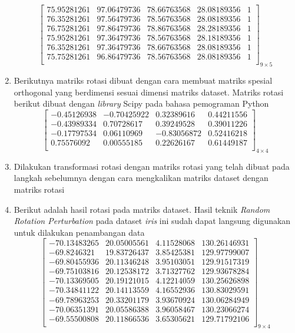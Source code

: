 \begin{enumerate}
\[\begin{bmatrix}
            75.95281261  & 97.06479736 &  78.66763568 &  28.08189356 & 1 \\
            76.35281261  & 97.56479736 &  78.56763568 &  28.08189356 & 1 \\
            76.75281261  & 97.86479736 &  78.86763568 &  28.28189356 & 1 \\
            75.95281261  & 97.36479736 &  78.56763568 &  28.18189356 & 1 \\
            76.35281261  & 97.36479736 &  78.66763568 &  28.08189356 & 1 \\
            75.75281261  & 96.86479736 &  78.56763568 &  28.08189356 & 1 \\
        \end{bmatrix}_{9\times 5}
    \]
    \item Berikutnya matriks rotasi dibuat dengan cara membuat matriks spesial orthogonal yang berdimensi sesuai dimensi matriks dataset. Matriks rotasi berikut dibuat dengan \textit{library} Scipy pada bahasa pemograman Python
    \[
        \begin{bmatrix}
            -0.45126938		&		-0.70425922		&		 0.32389616		&		0.44211556 \\
            -0.43989334		&		 0.70728617		&		 0.39249528		&		0.39011226 \\
            -0.17797534		&		 0.06110969		&		-0.83056872		&		0.52416218 \\
             0.75576092		&		 0.00555185		&		 0.22626167		&		0.61449187 \\
        \end{bmatrix}_{4\times 4}
    \]
    \item Dilakukan transformasi rotasi dengan matriks rotasi yang telah dibuat pada langkah sebelumnya dengan cara mengkalikan matriks dataset dengan matriks rotasi
    \item Berikut adalah hasil rotasi pada matriks dataset. Hasil teknik \textit{Random Rotation Perturbation} pada dataset \textit{iris} ini sudah dapat langsung digunakan untuk dilakukan penambangan data
    \[
        \begin{bmatrix}
        -70.13483265  &  20.05005561  &   4.11528068  & 130.26146931 \\
        -69.8246321   &  19.83726437  &   3.85425381 &  129.97799007 \\
        -69.80455936  &  20.11346248  &   3.95103051 &  129.91517319 \\
        -69.75103816  &  20.12538172  &   3.71327762 &  129.93678284 \\
        -70.13369505  &  20.19121015  &   4.12214059 &  130.25626898 \\
        -70.34841122  &  20.14113559  &   4.16552936  & 130.83029591 \\
        -69.78963253 &   20.33201179  &   3.93670924 &  130.06284949 \\
        -70.06351391 &   20.05586388   &  3.96058467 &  130.23066274 \\
        -69.55500808  &  20.11866536  &   3.65305621  & 129.71792106 \\
        \end{bmatrix}_{9\times 4}
    \]
\end{enumerate} 

